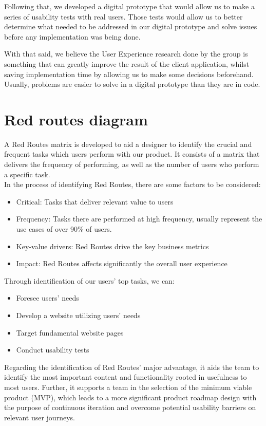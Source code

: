 \documentclass[a4paper,twoside,10pt]{report}
\begin{document}
Following that, we developed a digital prototype that would allow us to make a series of usability tests with real users. Those tests would allow us to better determine what needed to be addressed in our digital prototype and solve issues before any implementation was being done.

With that said, we believe the User Experience research done by the group is something that can greatly improve the result of the client application, whilst saving implementation time by allowing us to make some decisions beforehand. Usually, problems are easier to solve in a digital prototype than they are in code.

\section{Red routes diagram}
A  Red Routes matrix is developed to aid a designer to identify the crucial and frequent tasks which users perform with our product. It consists of a matrix that delivers the frequency of performing,  as well as the number of users who perform a specific task.
\\ \newline
In the process of identifying Red Routes, there are some factors to be considered:
\begin{itemize}
	\item  Critical: Tasks that deliver relevant value to users
 	\item Frequency: Tasks there are performed at high frequency, usually represent the use cases of over 90\% of users.
 	\item Key-value drivers: Red Routes drive the key business metrics
 	\item  Impact: Red Routes affects significantly the overall user experience
\end{itemize}
Through identification of our users' top tasks, we can:
\begin{itemize}
	\item Foresee users' needs
	\item Develop a website utilizing users' needs
	\item Target fundamental website pages
	\item Conduct usability tests
\end{itemize}	
Regarding the identification of Red Routes' major advantage, it aids the team to identify the most important content and functionality rooted in usefulness to most users.  Further, it supports a team in the selection of the minimum viable product (MVP), which leads to a more significant product roadmap design with the purpose of continuous iteration and overcome potential usability barriers on relevant user journeys. 
\end{document}
